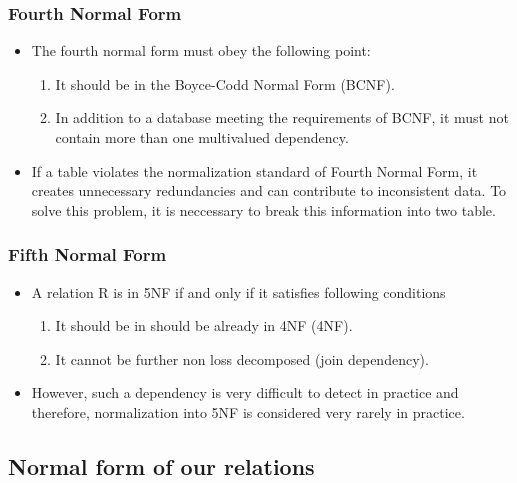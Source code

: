 \documentclass[12pt,a4paper]{article}
\begin{document}
 \subsubsection{Fourth Normal Form}
 \begin{itemize}
     \item The fourth normal form must obey the following point:
     \begin{enumerate}
            \item It should be in the Boyce-Codd Normal Form (BCNF).
            \item In addition to a database meeting the requirements of BCNF, it must not contain more than one multivalued dependency.
     \end{enumerate}
     \item If a table violates the normalization standard of Fourth Normal Form, it creates unnecessary redundancies and can contribute to inconsistent data. To solve this problem, it is neccessary to break this information into two table.
 \end{itemize}
 
  \subsubsection{Fifth Normal Form}
 \begin{itemize}
     \item A relation R is in 5NF if and only if it satisfies following conditions
     \begin{enumerate}
            \item It should be in should be already in 4NF (4NF).
            \item It cannot be further non loss decomposed (join dependency).
     \end{enumerate}
     \item However, such a dependency is very difficult to detect in practice and therefore, normalization into 5NF is considered very rarely in practice.
 \end{itemize}
 
 \subsection{Normal form of our relations}
\end{document}
